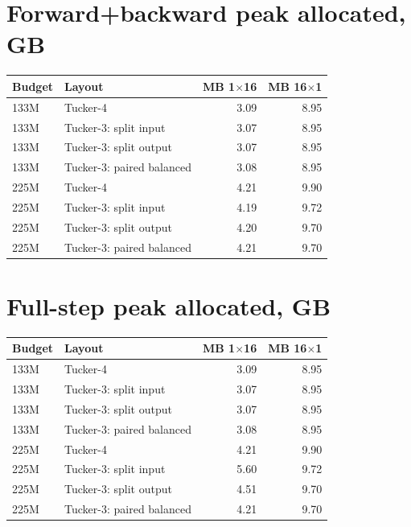 \documentclass[10pt]{article}
\begin{document}
\section{Forward+backward peak allocated, GB}
\begin{center}
\small
\begin{tabular}{llrr}
\toprule
\textbf{Budget} & \textbf{Layout} & \textbf{MB 1$\times$16} & \textbf{MB 16$\times$1} \\
\midrule
133M & Tucker-4 & 3.09 & 8.95 \\
133M & Tucker-3: split input & 3.07 & 8.95 \\
133M & Tucker-3: split output & 3.07 & 8.95 \\
133M & Tucker-3: paired balanced & 3.08 & 8.95 \\
225M & Tucker-4 & 4.21 & 9.90 \\
225M & Tucker-3: split input & 4.19 & 9.72 \\
225M & Tucker-3: split output & 4.20 & 9.70 \\
225M & Tucker-3: paired balanced & 4.21 & 9.70 \\
\bottomrule
\end{tabular}
\end{center}
\section{Full-step peak allocated, GB}
\begin{center}
\small
\begin{tabular}{llrr}
\toprule
\textbf{Budget} & \textbf{Layout} & \textbf{MB 1$\times$16} & \textbf{MB 16$\times$1} \\
\midrule
133M & Tucker-4 & 3.09 & 8.95 \\
133M & Tucker-3: split input & 3.07 & 8.95 \\
133M & Tucker-3: split output & 3.07 & 8.95 \\
133M & Tucker-3: paired balanced & 3.08 & 8.95 \\
225M & Tucker-4 & 4.21 & 9.90 \\
225M & Tucker-3: split input & 5.60 & 9.72 \\
225M & Tucker-3: split output & 4.51 & 9.70 \\
225M & Tucker-3: paired balanced & 4.21 & 9.70 \\
\bottomrule
\end{tabular}
\end{center}
\end{document}
